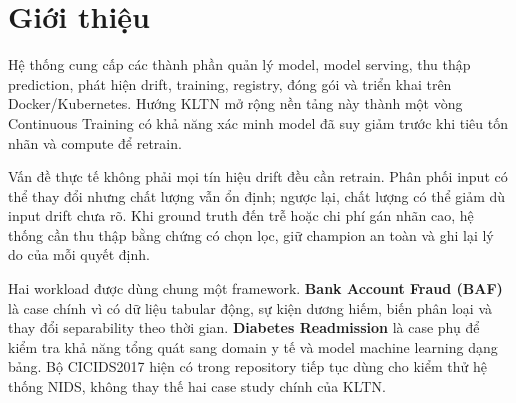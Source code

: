 \section{Giới thiệu}

Hệ thống cung cấp các thành phần quản lý model, model serving, thu thập prediction, phát hiện drift, training, registry, đóng gói và triển khai trên Docker/Kubernetes. Hướng KLTN mở rộng nền tảng này thành một vòng Continuous Training có khả năng xác minh model đã suy giảm trước khi tiêu tốn nhãn và compute để retrain.

Vấn đề thực tế không phải mọi tín hiệu drift đều cần retrain. Phân phối input có thể thay đổi nhưng chất lượng vẫn ổn định; ngược lại, chất lượng có thể giảm dù input drift chưa rõ. Khi ground truth đến trễ hoặc chi phí gán nhãn cao, hệ thống cần thu thập bằng chứng có chọn lọc, giữ champion an toàn và ghi lại lý do của mỗi quyết định.

\begin{center}
\end{center}

Hai workload được dùng chung một framework. \textbf{Bank Account Fraud (BAF)} là case chính vì có dữ liệu tabular động, sự kiện dương hiếm, biến phân loại và thay đổi separability theo thời gian. \textbf{Diabetes Readmission} là case phụ để kiểm tra khả năng tổng quát sang domain y tế và model machine learning dạng bảng. Bộ CICIDS2017 hiện có trong repository tiếp tục dùng cho kiểm thử hệ thống NIDS, không thay thế hai case study chính của KLTN.

